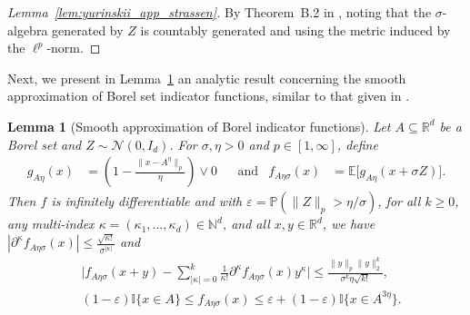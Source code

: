 \documentclass[11pt,lof]{puthesis}
\renewcommand{\P}{\ensuremath{\mathbb{P}}}
\newcommand{\N}{\ensuremath{\mathbb{N}}}
\newcommand{\R}{\ensuremath{\mathbb{R}}}
\newcommand{\E}{\ensuremath{\mathbb{E}}}
\newcommand{\I}{\ensuremath{\mathbb{I}}}
\newcommand{\cN}{\ensuremath{\mathcal{N}}}
\theoremstyle{break}
\newtheorem{lemma}{Lemma}[section]
\theoremstyle{proof}
\newtheorem{proof}{Proof}
\begin{document}
\begin{proof}[Lemma~\ref{lem:yurinskii_app_strassen}]
By Theorem~B.2 in \citet{chen2020jackknife}, noting that the $\sigma$-algebra
generated by $Z$ is countably generated and using the metric induced by the
$\ell^p$-norm.
\end{proof}

Next, we present in Lemma~\ref{lem:yurinskii_app_smooth_approximation} an
analytic result
concerning the smooth approximation of Borel set indicator functions, similar
to that given in \citet[Lemma~39]{belloni2019conditional}.

\begin{lemma}[Smooth approximation of Borel indicator functions]%
\label{lem:yurinskii_app_smooth_approximation}
Let $A \subseteq \R^d$ be a Borel set and $Z \sim \cN(0, I_d)$.
For $\sigma, \eta > 0$ and $p \in [1, \infty]$, define
%
\begin{align*}
g_{A\eta}(x)
&=
\left( 1 - \frac{\|x-A^\eta\|_p}{\eta} \right) \vee 0
& &\text{and}
&f_{A\eta\sigma}(x)
&=
\E\big[g_{A\eta}(x + \sigma Z) \big].
\end{align*}
%
Then $f$ is infinitely differentiable
and with $\varepsilon = \P(\|Z\|_p > \eta / \sigma)$,
for all $k \geq 0$,
any multi-index $\kappa = (\kappa_1,\dots, \kappa_d)\in\N^d$,
and all $x,y \in \R^d$,
we have $|\partial^\kappa f_{A\eta\sigma}(x)| \leq
\frac{\sqrt{\kappa!}}{\sigma^{|\kappa|}}$ and
%
\begin{align*}
&\Bigg|
f_{A\eta\sigma}(x+y) - \sum_{|\kappa| = 0}^k
\frac{1}{\kappa!}
\partial^\kappa f_{A\eta\sigma}(x)
y^\kappa
\Bigg|
\leq
\frac{\|y\|_p \|y\|_2^k}{\sigma^k \eta \sqrt{k!}}, \\
&(1 - \varepsilon) \I\big\{x \in A\big\}
\leq f_{A\eta\sigma}(x)
\leq \varepsilon + (1 - \varepsilon)
\I\big\{x \in A^{3\eta}\big\}.
\end{align*}
%
\end{lemma}
\end{document}
